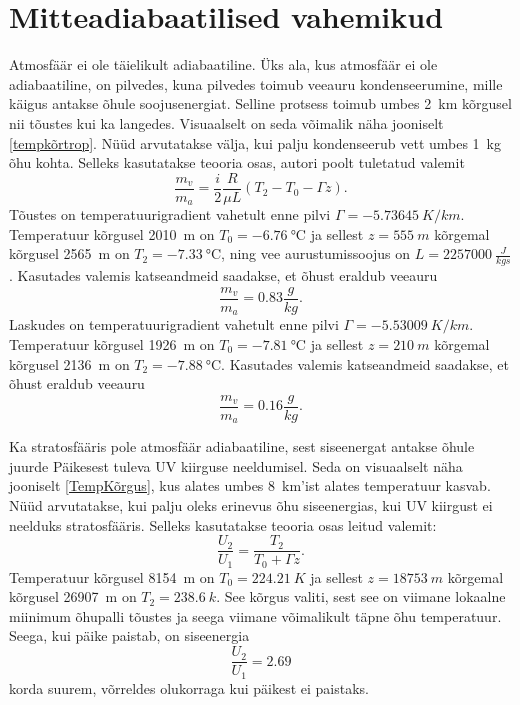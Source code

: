 \documentclass{trkut}%
\begin{document}
\section{Mitteadiabaatilised vahemikud}
Atmosfäär ei ole täielikult adiabaatiline. Üks ala, kus atmosfäär ei ole adiabaatiline, on pilvedes, kuna pilvedes toimub veeauru kondenseerumine, mille käigus antakse õhule soojusenergiat. Selline protsess toimub umbes \SI{2}{km} kõrgusel nii tõustes kui ka langedes. Visuaalselt on seda võimalik näha jooniselt \ref{tempkõrtrop}. Nüüd arvutatakse välja, kui palju kondenseerub vett umbes \SI{1}{kg} õhu kohta. Selleks kasutatakse teooria osas, autori poolt tuletatud valemit
\begin{equation}
\frac{m_v}{m_a} = \frac{i}{2}\frac{R}{\mu L}\left(T_2- T_0 - \Gamma z\right).
\end{equation}
Tõustes on temperatuurigradient vahetult enne pilvi $\Gamma = \SI{-5.73645}{K/km}$. Temperatuur kõrgusel \SI{2010}{m} on $T_0 = \SI{-6.76}{\degreeCelsius}$ ja sellest $z = \SI{555}{m}$ kõrgemal kõrgusel \SI{2565}{m} on $T_2 = \SI{-7.33}{\degreeCelsius}$, ning vee aurustumissoojus on $L = \SI{2257000}{\frac{J}{kgs}}$. Kasutades valemis katseandmeid saadakse, et õhust eraldub veeauru
\begin{equation}
\frac{m_v}{m_a} = 0.83 \frac{g}{kg}.
\end{equation}
Laskudes on temperatuurigradient vahetult enne pilvi $\Gamma = \SI{-5.53009}{K/km}$. Temperatuur kõrgusel \SI{1926}{m} on $T_0 = \SI{-7.81}{\degreeCelsius}$ ja sellest $z = \SI{210}{m}$ kõrgemal kõrgusel \SI{2136}{m} on $T_2 = \SI{-7.88}{\degreeCelsius}$. Kasutades valemis katseandmeid saadakse, et õhust eraldub veeauru
\begin{equation}
\frac{m_v}{m_a} = 0.16 \frac{g}{kg}.
\end{equation}

Ka stratosfääris pole atmosfäär adiabaatiline, sest siseenergat antakse õhule juurde Päikesest tuleva UV kiirguse neeldumisel. Seda on visuaalselt näha jooniselt \ref{TempKõrgus}, kus alates umbes \SI{8}{km}'ist alates temperatuur kasvab. Nüüd arvutatakse, kui palju oleks erinevus õhu siseenergias, kui UV kiirgust ei neelduks stratosfääris. Selleks kasutatakse teooria osas leitud valemit:
\begin{equation}
\frac{U_2}{U_1} = \frac{T_2}{T_0+\Gamma z}.
\end{equation}
Temperatuur kõrgusel \SI{8154}{m} on $T_0 = \SI{224.21}{K}$ ja sellest $z = \SI{18753}{m}$ kõrgemal kõrgusel \SI{26907}{m} on $T_2 = \SI{238.6}{k}$. See kõrgus valiti, sest see on viimane lokaalne miinimum õhupalli tõustes ja seega viimane võimalikult täpne õhu temperatuur. Seega, kui päike paistab, on siseenergia 
\begin{equation}
\frac{U_2}{U_1} = 2.69
\end{equation}
korda suurem, võrreldes olukorraga kui päikest ei paistaks.
\end{document}
